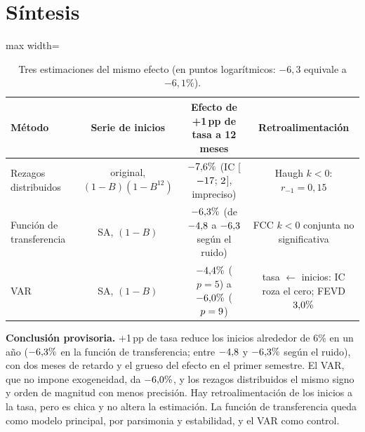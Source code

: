 \documentclass[11pt,a4paper]{article}
\begin{document}
\section{S\'intesis}
\begin{table}[H]\centering\small
\begin{adjustbox}{max width=\linewidth}\begin{tabular}{lccc}
\toprule
M\'etodo & Serie de inicios & Efecto de +1\,pp de tasa a 12 meses & Retroalimentaci\'on \\
\midrule
Rezagos distribuidos & original, $(1-B)(1-B^{12})$ & $-7{,}6\%$ (IC [$-17$; $2$], impreciso) & Haugh $k<0$: $r_{-1}=0{,}15$ \\
Funci\'on de transferencia & SA, $(1-B)$ & $-6{,}3\%$ (de $-4{,}8$ a $-6{,}3$ seg\'un el ruido) & FCC $k<0$ conjunta no significativa \\
VAR & SA, $(1-B)$ & $-4{,}4\%$ ($p=5$) a $-6{,}0\%$ ($p=9$) & tasa $\leftarrow$ inicios: IC roza el cero; FEVD $3{,}0\%$ \\
\bottomrule
\end{tabular}\end{adjustbox}
\caption{Tres estimaciones del mismo efecto (en puntos logar\'itmicos: $-6{,}3$ equivale a $-6{,}1\%$).}
\end{table}
\textbf{Conclusi\'on provisoria.} +1\,pp de tasa reduce los inicios alrededor de 6\% en un a\~no ($-6{,}3\%$ en la funci\'on de transferencia; entre $-4{,}8$ y $-6{,}3\%$ seg\'un el ruido), con dos meses de retardo y el grueso del efecto en el primer semestre. El VAR, que no impone exogeneidad, da $-6{,}0\%$, y los rezagos distribuidos el mismo signo y orden de magnitud con menos precisi\'on. Hay retroalimentaci\'on de los inicios a la tasa, pero es chica y no altera la estimaci\'on. La funci\'on de transferencia queda como modelo principal, por parsimonia y estabilidad, y el VAR como control.
\end{document}
